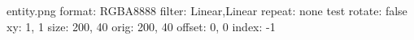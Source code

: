 
entity.png
format: RGBA8888
filter: Linear,Linear
repeat: none
test
  rotate: false
  xy: 1, 1
  size: 200, 40
  orig: 200, 40
  offset: 0, 0
  index: -1
